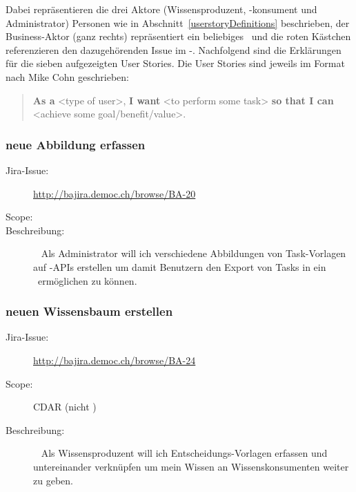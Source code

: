 		Dabei repräsentieren die drei Aktore (Wissensproduzent, -konsument und Administrator) Personen wie in Abschnitt~\ref{userstoryDefinitions} beschrieben,
		der Business-Aktor (ganz rechts) repräsentiert ein beliebiges \ppt\ und die roten Kästchen referenzieren den dazugehörenden Issue im \eeppi-\ppt.
		Nachfolgend sind die Erklärungen für die sieben aufgezeigten User Stories.
		Die User Stories sind jeweils im Format nach Mike Cohn\cite{jonathan_rasmusson_agile_2012} geschrieben:
		\begin{quote}
			\textbf{As a} <type of user>,\newline
			\textbf{I want} <to perform some task>\newline
			\textbf{so that I can} <achieve some goal/benefit/value>.
		\end{quote}
		
	\subsubsection{neue Abbildung erfassen}
		\begin{description}
			\item[Jira-Issue:] \url{http://bajira.democ.ch/browse/BA-20}
			\item[Scope:] \eeppi
			\item[Beschreibung:]\ \newline
				Als Administrator\newline
				will ich verschiedene Abbildungen von Task-Vorlagen auf \ppt-APIs erstellen\newline
				um damit Benutzern den Export von Tasks in ein \ppt\ ermöglichen zu können.
		\end{description}

	\subsubsection{neuen Wissensbaum erstellen}
		\begin{description}
			\item[Jira-Issue:] \url{http://bajira.democ.ch/browse/BA-24}
			\item[Scope:] CDAR (nicht \eeppi)
			\item[Beschreibung:]\ \newline
				Als Wissensproduzent\newline
				will ich Entscheidungs-Vorlagen erfassen und untereinander verknüpfen\newline
				um mein Wissen an Wissenskonsumenten weiter zu geben.
		\end{description}

